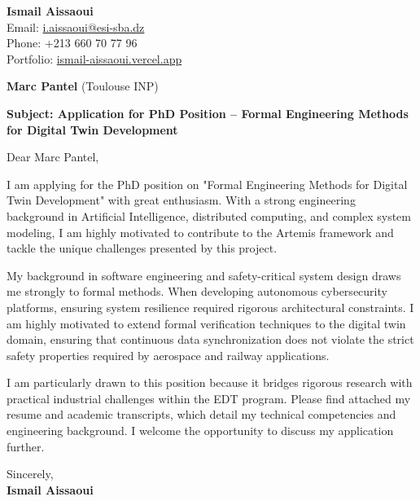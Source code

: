 \documentclass[11pt,a4paper]{article}
\begin{document}
\thispagestyle{empty}

\begin{flushright}
\textbf{Ismail Aissaoui} \\
Email: \href{mailto:i.aissaoui@esi-sba.dz}{i.aissaoui@esi-sba.dz} \\
Phone: +213 660 70 77 96 \\
Portfolio: \href{https://ismail-aissaoui.vercel.app}{ismail-aissaoui.vercel.app}
\end{flushright}

\vspace{1em}

\begin{flushleft}
\textbf{Marc Pantel} (Toulouse INP)
\end{flushleft}

\vspace{1em}
\noindent\textbf{Subject: Application for PhD Position -- Formal Engineering Methods for Digital Twin Development}
\vspace{1em}

\noindent Dear Marc Pantel,

\vspace{1em}
\noindent
I am applying for the PhD position on "Formal Engineering Methods for Digital Twin Development" with great enthusiasm. With a strong engineering background in Artificial Intelligence, distributed computing, and complex system modeling, I am highly motivated to contribute to the Artemis framework and tackle the unique challenges presented by this project.

\vspace{0.5em}
\noindent
My background in software engineering and safety-critical system design draws me strongly to formal methods. When developing autonomous cybersecurity platforms, ensuring system resilience required rigorous architectural constraints. I am highly motivated to extend formal verification techniques to the digital twin domain, ensuring that continuous data synchronization does not violate the strict safety properties required by aerospace and railway applications.

\vspace{0.5em}
\noindent
I am particularly drawn to this position because it bridges rigorous research with practical industrial challenges within the EDT program. Please find attached my resume and academic transcripts, which detail my technical competencies and engineering background. I welcome the opportunity to discuss my application further.

\vspace{1.5em}
\noindent
Sincerely, \\[0.5em]
\textbf{Ismail Aissaoui}
\end{document}
